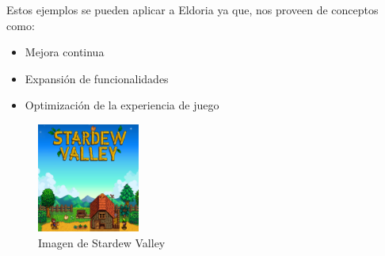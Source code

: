 \documentclass[a4paper]{article}
\begin{document}
Estos ejemplos se pueden aplicar a Eldoria ya que, nos proveen de conceptos como:
\begin{itemize}
    \item Mejora continua
    \item Expansión de funcionalidades
    \item Optimización de la experiencia de juego
\end{itemize}
\begin{figure}[ht]
    \centering
    \includegraphics[width=0.3\textwidth]{Images/Logo_of_Stardew_Valley.png}
    \caption{Imagen de Stardew Valley}
    \label{fig:stardewValley}
\end{figure}
\clearpage
\end{document}
